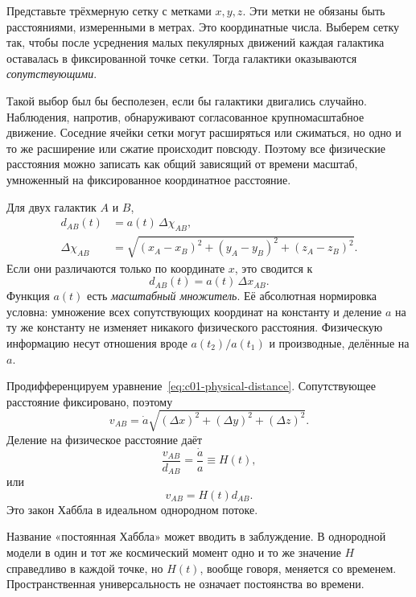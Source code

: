 Представьте трёхмерную сетку с метками \(x,y,z\). Эти метки не обязаны быть расстояниями, измеренными в метрах. Это координатные числа. Выберем сетку так, чтобы после усреднения малых пекулярных движений каждая галактика оставалась в фиксированной точке сетки. Тогда галактики оказываются \emph{сопутствующими}.

Такой выбор был бы бесполезен, если бы галактики двигались случайно. Наблюдения, напротив, обнаруживают согласованное крупномасштабное движение. Соседние ячейки сетки могут расширяться или сжиматься, но одно и то же расширение или сжатие происходит повсюду. Поэтому все физические расстояния можно записать как общий зависящий от времени масштаб, умноженный на фиксированное координатное расстояние.

Для двух галактик \(A\) и \(B\),
\begin{equation}
\begin{aligned}
d_{AB}(t)&=a(t)\,\Delta\chi_{AB},\\
\Delta\chi_{AB}
&=\sqrt{(x_A-x_B)^2+(y_A-y_B)^2+(z_A-z_B)^2}.
\end{aligned}
\label{eq:c01-physical-distance}
\end{equation}
Если они различаются только по координате \(x\), это сводится к
\begin{equation}
d_{AB}(t)=a(t)\,\Delta x_{AB}.
\end{equation}
Функция \(a(t)\) есть \emph{масштабный множитель}. Её абсолютная нормировка условна: умножение всех сопутствующих координат на константу и деление \(a\) на ту же константу не изменяет никакого физического расстояния. Физическую информацию несут отношения вроде \(a(t_2)/a(t_1)\) и производные, делённые на \(a\).

Продифференцируем уравнение~\eqref{eq:c01-physical-distance}. Сопутствующее расстояние фиксировано, поэтому
\begin{equation}
v_{AB}=\dot a\sqrt{(\Delta x)^2+(\Delta y)^2+(\Delta z)^2}.
\end{equation}
Деление на физическое расстояние даёт
\begin{equation}
\frac{v_{AB}}{d_{AB}}=\frac{\dot a}{a}\equiv H(t),
\label{eq:c01-hubble-parameter}
\end{equation}
или
\begin{equation}
\boxed{v_{AB}=H(t)d_{AB}.}
\label{eq:c01-hubble-law}
\end{equation}
Это закон Хаббла в идеальном однородном потоке.

Название «постоянная Хаббла» может вводить в заблуждение. В однородной модели в один и тот же космический момент одно и то же значение \(H\) справедливо в каждой точке, но \(H(t)\), вообще говоря, меняется со временем. Пространственная универсальность не означает постоянства во времени.

